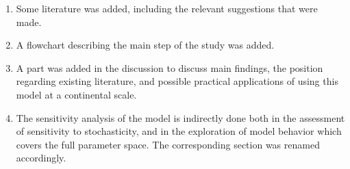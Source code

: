 \documentclass[11pt,a4paper,sans]{moderncv}        %
\begin{document}
\begin{enumerate}
	\item Some literature was added, including the relevant suggestions that were made.
	\item A flowchart describing the main step of the study was added.
	\item A part was added in the discussion to discuss main findings, the position regarding existing literature, and possible practical applications of using this model at a continental scale.
	\item The sensitivity analysis of the model is indirectly done both in the assessment of sensitivity to stochasticity, and in the exploration of model behavior which covers the full parameter space. The corresponding section was renamed accordingly.
\end{enumerate}














\justify




\makeletterclosing
\end{document}
